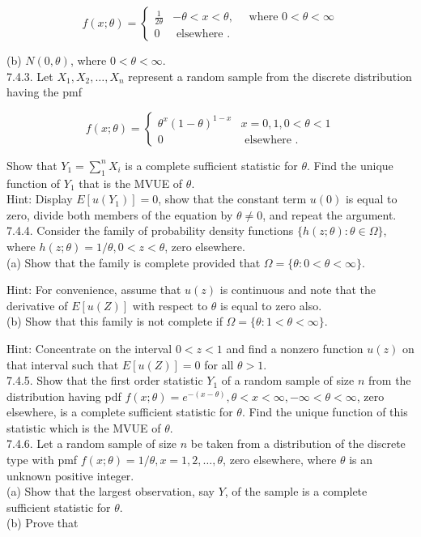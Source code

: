 $$
f(x ; \theta)=\left\{\begin{array}{lc}
\frac{1}{2 \theta} & -\theta<x<\theta, \quad \text { where } 0<\theta<\infty \\
0 & \text { elsewhere } .
\end{array}\right.
$$

(b) $N(0, \theta)$, where $0<\theta<\infty$.\\
7.4.3. Let $X_{1}, X_{2}, \ldots, X_{n}$ represent a random sample from the discrete distribution having the pmf

$$
f(x ; \theta)= \begin{cases}\theta^{x}(1-\theta)^{1-x} & x=0,1,0<\theta<1 \\ 0 & \text { elsewhere } .\end{cases}
$$

Show that $Y_{1}=\sum_{1}^{n} X_{i}$ is a complete sufficient statistic for $\theta$. Find the unique function of $Y_{1}$ that is the MVUE of $\theta$.\\
Hint: Display $E\left[u\left(Y_{1}\right)\right]=0$, show that the constant term $u(0)$ is equal to zero, divide both members of the equation by $\theta \neq 0$, and repeat the argument.\\
7.4.4. Consider the family of probability density functions $\{h(z ; \theta): \theta \in \Omega\}$, where $h(z ; \theta)=1 / \theta, 0<z<\theta$, zero elsewhere.\\
(a) Show that the family is complete provided that $\Omega=\{\theta: 0<\theta<\infty\}$.

Hint: For convenience, assume that $u(z)$ is continuous and note that the derivative of $E[u(Z)]$ with respect to $\theta$ is equal to zero also.\\
(b) Show that this family is not complete if $\Omega=\{\theta: 1<\theta<\infty\}$.

Hint: Concentrate on the interval $0<z<1$ and find a nonzero function $u(z)$ on that interval such that $E[u(Z)]=0$ for all $\theta>1$.\\
7.4.5. Show that the first order statistic $Y_{1}$ of a random sample of size $n$ from the distribution having pdf $f(x ; \theta)=e^{-(x-\theta)}, \theta<x<\infty,-\infty<\theta<\infty$, zero elsewhere, is a complete sufficient statistic for $\theta$. Find the unique function of this statistic which is the MVUE of $\theta$.\\
7.4.6. Let a random sample of size $n$ be taken from a distribution of the discrete type with pmf $f(x ; \theta)=1 / \theta, x=1,2, \ldots, \theta$, zero elsewhere, where $\theta$ is an unknown positive integer.\\
(a) Show that the largest observation, say $Y$, of the sample is a complete sufficient statistic for $\theta$.\\
(b) Prove that

